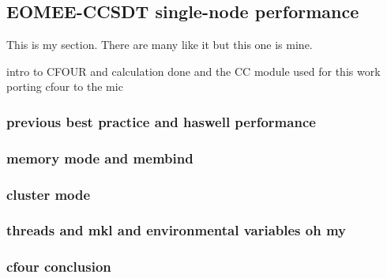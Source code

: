 \subsection{EOMEE-CCSDT single-node performance}
\label{sec:cfour}

This is my section. There are many like it but this one is mine.

intro to CFOUR and calculation done and the CC module used for this work
porting cfour to the mic

\subsubsection{previous best practice and haswell performance}
\subsubsection{memory mode and membind}
\subsubsection{cluster mode}
\subsubsection{threads and mkl and environmental variables oh my}
\subsubsection{cfour conclusion}
